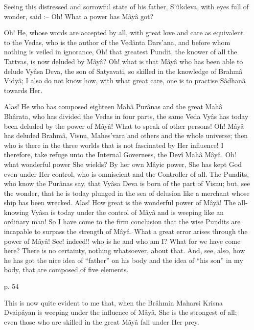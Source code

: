  

Seeing this distressed and sorrowful state of his father, S'ûkdeva, with eyes full of wonder, said :-- Oh! What a power has Mâyâ got?

 

Oh!  He, whose words are accepted by all, with great love and care as equivalent to the Vedas, who is the author of the Vedânta Dars'ana, and before whom nothing is veiled in ignorance, Oh! that greatest Pundit, the knower of all the Tattvas, is now deluded by Mâyâ? Oh! what is that Mâyâ who has been able to delude Vyâsa Deva, the son of Satyavati, so skilled in the knowledge of Brahmâ Vidyâ; I also do not know how, with what great care, one is to practise Sâdhanâ towards Her.

 

Alas! He who has composed eighteen Mahâ Purânas and the great Mahâ Bhârata, who has divided the Vedas in four parts, the same Veda Vyâs has today been deluded by the power of Mâyâ! What to speak of other persons! Oh! Mâyâ has deluded Brahmâ, Visnu, Mahes'vara and others and the whole universe; then who is there in the three worlds that is not fascinated by Her influence! I therefore, take refuge unto the Internal Governess, the Devî Mahâ Mâyâ. Oh! what wonderful power She wields? By her own Mâyic power, She has kept God even under Her control, who is omniscient and the Controller of all. The Pundits, who know the Purânas say, that Vyâsa Deva is born of the part of Visnu; but, see the wonder, that he is today plunged in the sea of delusion like a merchant whose ship has been wrecked. Alas! How great is the wonderful power of Mâyâ! The all-knowing Vyâsa is today under the control of Mâyâ and is weeping like an ordinary man! So I have come to the firm conclusion that the wise Pundits are incapable to surpass the strength of Mâyâ. What a great error arises through the power of Mâyâ! See! indeed!! who is he and who am I? What for we have come here? There is no certainty, nothing whatsoever, about that. And, see, also, how he has got the nice idea of “father” on his body and the idea of “his son” in my body, that are composed of five elements.

 

p. 54

 

This is now quite evident to me that, when the Brâhmin Maharsi Krisna Dvaipâyan is weeping under the influence of Mâyâ, She is the strongest of all; even those who are skilled in the great Mâyâ fall under Her prey.

